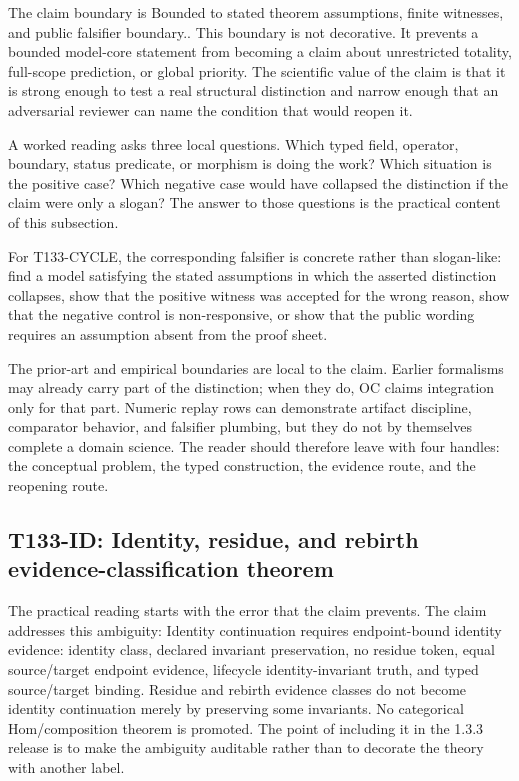 The claim boundary is Bounded to stated theorem assumptions, finite witnesses, and public falsifier boundary.. This boundary is not decorative. It prevents a bounded model-core statement from becoming a claim about unrestricted totality, full-scope prediction, or global priority. The scientific value of the claim is that it is strong enough to test a real structural distinction and narrow enough that an adversarial reviewer can name the condition that would reopen it.

A worked reading asks three local questions. Which typed field, operator, boundary, status predicate, or morphism is doing the work? Which situation is the positive case? Which negative case would have collapsed the distinction if the claim were only a slogan? The answer to those questions is the practical content of this subsection.

For T133-CYCLE, the corresponding falsifier is concrete rather than slogan-like: find a model satisfying the stated assumptions in which the asserted distinction collapses, show that the positive witness was accepted for the wrong reason, show that the negative control is non-responsive, or show that the public wording requires an assumption absent from the proof sheet.

The prior-art and empirical boundaries are local to the claim. Earlier formalisms may already carry part of the distinction; when they do, OC claims integration only for that part. Numeric replay rows can demonstrate artifact discipline, comparator behavior, and falsifier plumbing, but they do not by themselves complete a domain science. The reader should therefore leave with four handles: the conceptual problem, the typed construction, the evidence route, and the reopening route.

\subsection{T133-ID: Identity, residue, and rebirth evidence-classification theorem}
The practical reading starts with the error that the claim prevents. The claim addresses this ambiguity: Identity continuation requires endpoint-bound identity evidence: identity class, declared invariant preservation, no residue token, equal source/target endpoint evidence, lifecycle identity-invariant truth, and typed source/target binding. Residue and rebirth evidence classes do not become identity continuation merely by preserving some invariants. No categorical Hom/composition theorem is promoted. The point of including it in the 1.3.3 release is to make the ambiguity auditable rather than to decorate the theory with another label.

